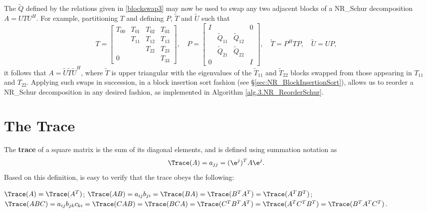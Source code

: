 The $\tilde Q$ defined by the relations given in \eqref{blockswap3} may now be used to swap any two adjacent blocks of a NR_Schur decomposition $A=U T U^H$.
For example, partitioning $T$ and defining $P$, $\tilde T$ and $\tilde U$ such that
\begin{equation*}
T=\begin{bmatrix} T_{00} & T_{01} & T_{02} & T_{03} \\  & T_{11} & T_{12} & T_{13} \\ &  & T_{22} & T_{23} \\ 0 &  &  & T_{33} \end{bmatrix}, \quad
P=\begin{bmatrix} I & &  & 0 \\ & \tilde Q_{11} & \tilde Q_{12} & \\ & \tilde Q_{21} & \tilde Q_{22} & \\ 0 & & & I \end{bmatrix}, \quad
\tilde T=P^H T P, \quad \tilde U=U P,
\end{equation*}
it follows that $A=\tilde U \tilde T \tilde U^H$, where $\tilde T$ is upper triangular with the eigenvalues of the $\tilde T_{11}$ and $\tilde T_{22}$ blocks swapped from those
appearing in $T_{11}$ and $T_{22}$.
Applying such swaps in succession, in a block insertion sort fashion (see \S \ref{sec:NR_BlockInsertionSort}),
allows us to reorder a NR_Schur decomposition in any desired fashion, as implemented in Algorithm \ref{alg.3.NR_ReorderSchur}. 

\section{The Trace}\label{sec.A.F.A}

The {\bf trace} of a square matrix is the sum of its diagonal elements, and is defined using summation notation as
\begin{equation*}
    \Trace(A)= a_{jj} = (\e^j)^T A \e^j.
\end{equation*}
Based on this definition,  is easy to verify that the trace obeys the following:

\begin{fact} \label{fact.A.F.A.a}
$\Trace(A)=\Trace(A^T)$;\quad
$\Trace(AB)= a_{ij} b_{ji} = \Trace(BA) = \Trace(B^T A^T) = \Trace(A^T B^T)$;\hfill\break
$\Trace(ABC)= a_{ij} b_{jk} c_{ki} =\Trace(CAB)=\Trace(BCA)=\Trace(C^T B^T A^T)=\Trace( A^T C^T B^T)=\Trace(B^T A^T C^T)$.
\end{fact}

